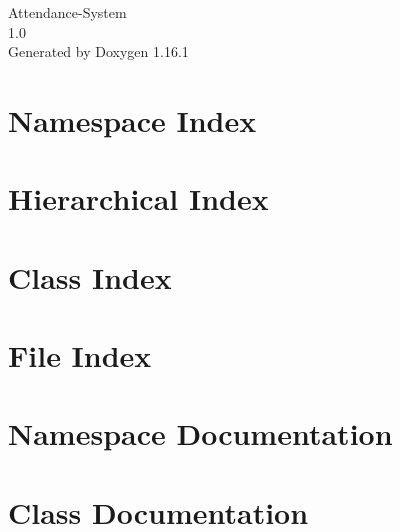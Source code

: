 \documentclass[twoside]{book}
\newcommand{\+}{\discretionary{\mbox{\scriptsize$\hookleftarrow$}}{}{}}
\newcommand{\clearemptydoublepage}{%
    \newpage{\pagestyle{empty}\cleardoublepage}%
  }
\begin{document}
  \raggedbottom
    \hypersetup{pageanchor=false,
                bookmarksnumbered=true,
                pdfencoding=unicode
               }
  \begin{titlepage}
  \vspace*{7cm}
  \begin{center}%
  {\Large Attendance-\/\+System}\\
  [1ex]\large 1.\+0 \\
  \vspace*{1cm}
  {\large Generated by Doxygen 1.16.1}\\
  \end{center}
  \end{titlepage}
  \clearemptydoublepage
  \tableofcontents
  \clearemptydoublepage
  \hypersetup{pageanchor=true}
\chapter{Namespace Index}

\chapter{Hierarchical Index}

\chapter{Class Index}

\chapter{File Index}

\chapter{Namespace Documentation}

\chapter{Class Documentation}












\end{document}
